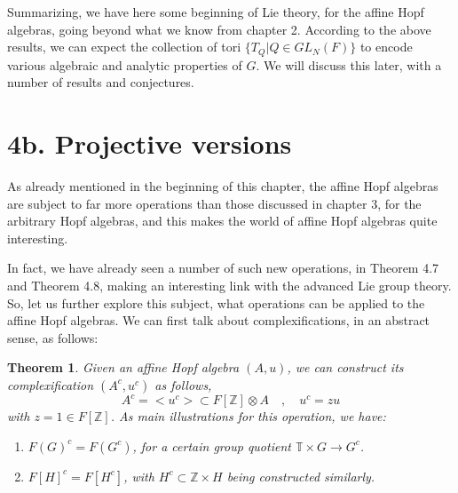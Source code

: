 \documentclass[12pt]{amsbook}
\newtheorem{theorem}{Theorem}[chapter]
\begin{document}
Summarizing, we have here some beginning of Lie theory, for the affine Hopf algebras, going beyond what we know from chapter 2. According to the above results, we can expect the collection of tori $\{T_Q|Q\in GL_N(F)\}$ to encode various algebraic and analytic properties of $G$. We will discuss this later, with a number of results and conjectures.

\section*{4b. Projective versions}

As already mentioned in the beginning of this chapter, the affine Hopf algebras are subject to far more operations than those discussed in chapter 3, for the arbitrary Hopf algebras, and this makes the world of affine Hopf algebras quite interesting. 

\bigskip

In fact, we have already seen a number of such new operations, in Theorem 4.7 and Theorem 4.8, making an interesting link with the advanced Lie group theory. So, let us further explore this subject, what operations can be applied to the affine Hopf algebras. We can first talk about complexifications, in an abstract sense, as follows:


\begin{theorem}
Given an affine Hopf algebra $(A,u)$, we can construct its complexification $(A^c,u^c)$ as follows,
$$A^c=<u^c>\subset F[\mathbb Z]\otimes A\quad,\quad u^c=zu$$
with $z=1\in F[\mathbb Z]$. As main illustrations for this operation, we have:
\begin{enumerate}
\item $F(G)^c=F(G^c)$, for a certain group quotient $\mathbb T\times G\to G^c$.

\item $F[H]^c=F[H^c]$, with $H^c\subset\mathbb Z\times H$ being constructed similarly.
\end{enumerate}
\end{theorem}
\end{document}
